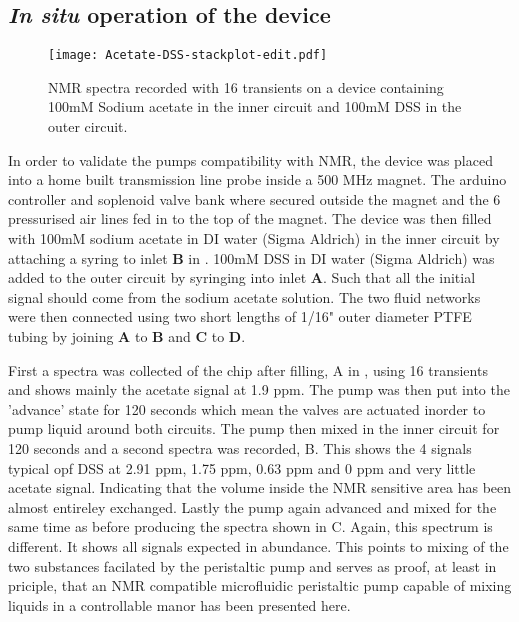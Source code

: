 \subsection{\textit{In situ} operation of the device}

\begin{figure}
  \begin{center}
  \texttt{[image: Acetate-DSS-stackplot-edit.pdf]}
  \caption{NMR spectra recorded with 16 transients on a device containing 100mM Sodium
  acetate in the inner circuit and 100mM DSS in the outer circuit.}
  \label{fig:spectra}
  \end{center}
\end{figure}

In order to validate the pumps compatibility with NMR, the device was placed into a home
built transmission line probe inside a 500 MHz magnet. The arduino controller and soplenoid valve
bank where secured outside the magnet and the 6 pressurised air lines fed in to the top of
the magnet. The device was then filled with 100mM sodium acetate in DI water (Sigma Aldrich) in
the inner circuit by attaching a syring to inlet \textbf{B} in . 100mM DSS in DI
water (Sigma Aldrich) was added to the outer circuit by syringing into inlet \textbf{A}. Such
that all the initial signal should come from the sodium acetate solution. The two fluid networks
were then connected using two short lengths of 1/16" outer diameter PTFE tubing by joining
\textbf{A} to \textbf{B} and \textbf{C} to \textbf{D}.

First a spectra was collected of the chip after filling, A in , using 16
transients and shows mainly the acetate signal at 1.9 ppm. The pump was then put into
the 'advance' state for 120 seconds which mean the valves are actuated inorder to pump
liquid around both circuits. The pump then mixed in the inner circuit for 120 seconds
and a second spectra was recorded, B. This shows the 4 signals typical opf DSS at 2.91
ppm, 1.75 ppm, 0.63 ppm and 0 ppm and very little acetate signal. Indicating that the
volume inside the NMR sensitive area has been almost entireley exchanged. Lastly the
pump again advanced and mixed for the same time as before producing the spectra shown
in C. Again, this spectrum is different. It shows all signals expected in abundance.
This points to mixing of the two substances facilated by the peristaltic pump and serves
as proof, at least in priciple, that an NMR compatible microfluidic peristaltic pump
capable of mixing liquids in a controllable manor has been presented here.

